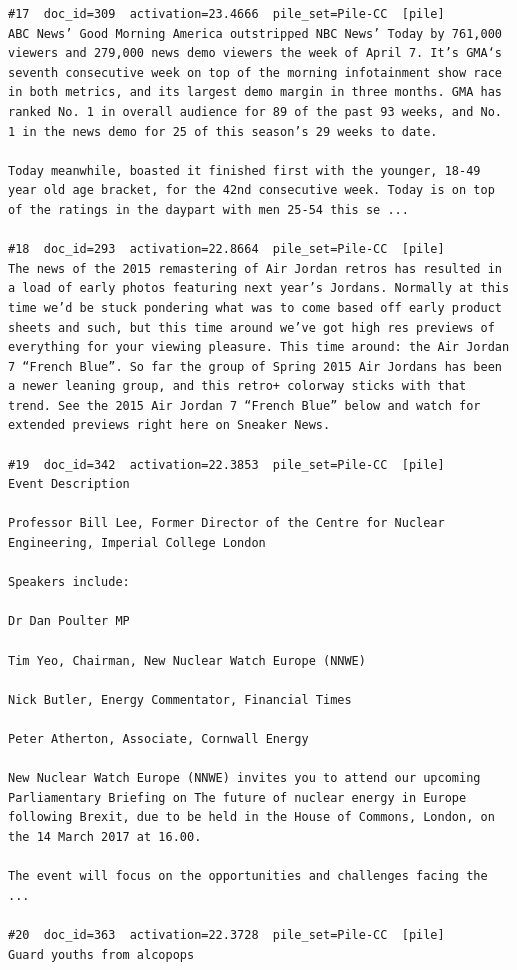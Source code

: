 \begin{verbatim}
#17  doc_id=309  activation=23.4666  pile_set=Pile-CC  [pile]
ABC News’ Good Morning America outstripped NBC News’ Today by 761,000 viewers and 279,000 news demo viewers the week of April 7. It’s GMA‘s seventh consecutive week on top of the morning infotainment show race in both metrics, and its largest demo margin in three months. GMA has ranked No. 1 in overall audience for 89 of the past 93 weeks, and No. 1 in the news demo for 25 of this season’s 29 weeks to date.

Today meanwhile, boasted it finished first with the younger, 18-49 year old age bracket, for the 42nd consecutive week. Today is on top of the ratings in the daypart with men 25-54 this se ...

#18  doc_id=293  activation=22.8664  pile_set=Pile-CC  [pile]
The news of the 2015 remastering of Air Jordan retros has resulted in a load of early photos featuring next year’s Jordans. Normally at this time we’d be stuck pondering what was to come based off early product sheets and such, but this time around we’ve got high res previews of everything for your viewing pleasure. This time around: the Air Jordan 7 “French Blue”. So far the group of Spring 2015 Air Jordans has been a newer leaning group, and this retro+ colorway sticks with that trend. See the 2015 Air Jordan 7 “French Blue” below and watch for extended previews right here on Sneaker News.

#19  doc_id=342  activation=22.3853  pile_set=Pile-CC  [pile]
Event Description

Professor Bill Lee, Former Director of the Centre for Nuclear Engineering, Imperial College London

Speakers include:

Dr Dan Poulter MP

Tim Yeo, Chairman, New Nuclear Watch Europe (NNWE)

Nick Butler, Energy Commentator, Financial Times

Peter Atherton, Associate, Cornwall Energy

New Nuclear Watch Europe (NNWE) invites you to attend our upcoming Parliamentary Briefing on The future of nuclear energy in Europe following Brexit, due to be held in the House of Commons, London, on the 14 March 2017 at 16.00.

The event will focus on the opportunities and challenges facing the ...

#20  doc_id=363  activation=22.3728  pile_set=Pile-CC  [pile]
Guard youths from alcopops


\end{verbatim}
